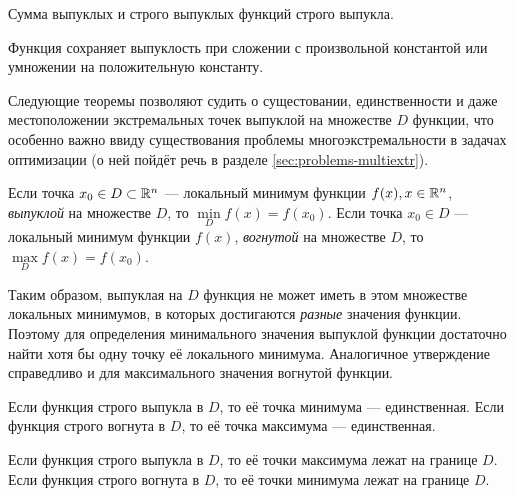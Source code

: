 \begin{thm}
  \label{th:sconvex-f-sum}
  Сумма выпуклых и строго выпуклых функций строго выпукла.
\end{thm}

\begin{thm}
  \label{th:convex-f-factor}
  Функция сохраняет выпуклость при сложении с произвольной константой
  или умножении на положительную константу.
\end{thm}

Следующие теоремы позволяют судить о сущестовании, единственности и
даже местоположении экстремальных точек выпуклой на множестве $D$
функции, что особенно важно ввиду существования проблемы
многоэкстремальности в задачах оптимизации (о ней пойдёт речь в
разделе \ref{sec:problems-multiextr}).

\begin{thm}
  \label{th:convex-f-locmin}
  Если точка $x_0 \in D \subset \mathbb{R}^n$ — локальный минимум функции
  $f(x), x \in \mathbb{R}^n$, \emph{выпуклой} на множестве $D$, то
  $\underset{D}{\min}{f(x)} = f(x_0)$. Если точка $x_0 \in D$ —
  локальный минимум функции $f(x)$, \emph{вогнутой} на множестве $D$,
  то $\underset{D}{\max}{f(x)} = f(x_0)$.
\end{thm}
Таким образом, выпуклая на $D$ функция не может иметь в этом множестве
локальных минимумов, в которых достигаются \emph{разные} значения
функции. Поэтому для определения минимального значения выпуклой
функции достаточно найти хотя бы одну точку её локального минимума.
Аналогичное утверждение справедливо и для максимального значения
вогнутой функции.

\begin{thm}
  \label{th:convex-f-smin}
  Если функция строго выпукла в $D$, то её точка минимума —
  единственная.
  Если функция строго вогнута в $D$, то её точка максимума —
  единственная.
\end{thm}

\begin{thm}
  \label{th:convex-f-nomax}
  Если функция строго выпукла в $D$, то её точки максимума лежат на
  границе $D$.
  Если функция строго вогнута в $D$, то её точки минимума лежат на
  границе $D$.
\end{thm}

